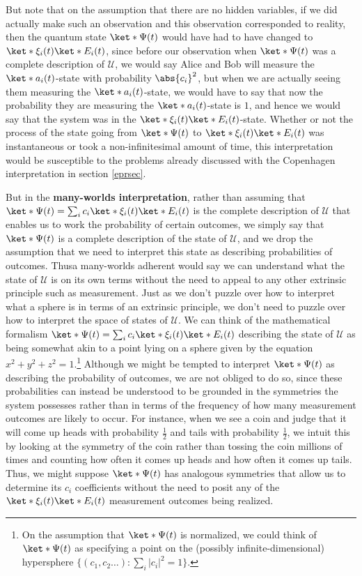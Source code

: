 \documentclass[12pt]{report}
\providecommand{\DIFadd}[1]{{\protect\color{blue}\uwave{#1}}} %
\providecommand{\DIFaddbegin}{} %
\providecommand{\DIFaddend}{} %
\begin{document}
     But note that on the assumption that there are no hidden variables, if we did actually make such an observation and this observation corresponded to reality, then the quantum state $\ket*{\Psi(t)}$ would have had to have changed to $\ket*{\xi_i(t)}\ket*{E_i(t)}$, since before our observation when $\ket*{\Psi(t)}$ was a complete description of $\mathcal{U}$, we would say Alice and Bob will measure the $\ket*{a_i(t)}$-state with probability $\abs{c_i}^2$, but when we are actually seeing them measuring the $\ket*{a_i(t)}$-state, we would have to say that now the probability they are measuring the $\ket*{a_i(t)}$-state is $1$, and hence we would say that the system was in the $\ket*{\xi_i(t)}\ket*{E_i(t)}$-state. Whether or not the process of the state going from $\ket*{\Psi(t)}$ to $\ket*{\xi_i(t)}\ket*{E_i(t)}$ was instantaneous or took a non-infinitesimal amount of time, this interpretation would be susceptible to the problems already discussed with the Copenhagen interpretation in section \ref{eprsec}.

    But in the \textbf{many-worlds interpretation}, rather than assuming that $\ket*{\Psi(t)}=\sum_i c_i \ket*{\xi_i(t)}\ket*{E_i(t)}$ is the complete description of $\mathcal{U}$ that enables us to work the probability of certain outcomes, we simply say that $\ket*{\Psi(t)}$ is a complete description of the state of $\mathcal{U}$, and we drop the assumption that we need to interpret this state as describing probabilities of outcomes. Thus\DIFaddbegin \DIFadd{, }\DIFaddend a many-worlds adherent would say we can understand what the state of $\mathcal{U}$ is on its own terms without the need to appeal to any other extrinsic principle such as measurement. Just as we don't puzzle over how to interpret what a sphere is in terms of an extrinsic principle, we don't need to puzzle over how to interpret the space of states of $\mathcal{U}$. We can think of the mathematical formalism $\ket*{\Psi(t)}=\sum_i c_i \ket*{\xi_i(t)}\ket*{E_i(t)}$ describing the state of $\mathcal{U}$ as being somewhat akin to a point lying on a sphere given by the equation $x^2+y^2+z^2=1$.\footnote{On the assumption that $\ket*{\Psi(t)}$ is normalized, we could think of $\ket*{\Psi(t)}$ as specifying a point on the (possibly infinite-dimensional) hypersphere $\{(c_1,c_2\ldots):\sum_i|c_i|^2=1\}.$} Although we might be tempted to interpret $\ket*{\Psi(t)}$ as describing the probability of outcomes, we are not obliged to do so,  since these probabilities can instead be understood to be grounded in the symmetries the system possesses rather than in terms of the frequency of how many measurement outcomes are likely to occur. For instance, when we see a coin and judge that it will come up heads with probability $\frac{1}{2}$ and tails with probability $\frac{1}{2}$, we intuit this by looking at the symmetry of the coin rather than tossing the coin millions of times and counting how often it comes up heads and how often it comes up tails. Thus, we might suppose $\ket*{\Psi(t)}$ has analogous symmetries that allow us to determine its $c_i$ coefficients without the need to posit any of the $\ket*{\xi_i(t)}\ket*{E_i(t)}$ measurement outcomes being realized.
\end{document}
